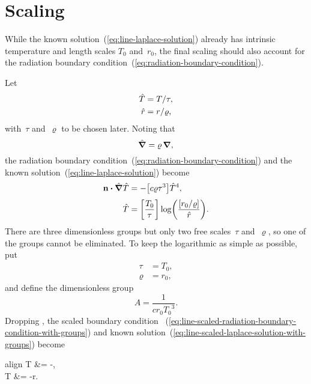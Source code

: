 \section{Scaling}
\label{sec:polar.scaling}

While the known solution~(\ref{eq:line-laplace-solution})
already has intrinsic temperature and length scales $T_0$ and~$r_0$,
the final scaling should also account for
the radiation boundary condition~(\ref{eq:radiation-boundary-condition}).

Let
\begin{align}
  \hat{T} &= T / \tau, \label{eq:line-scaled-temperature} \\
  \hat{r} &= r / \varrho, \label{eq:line-scaled-r}
\end{align}
with~$\tau$ and~$\varrho$ to be chosen later.
Noting that
\begin{equation}
  \mathop{}\!\hat{\mathop{}\!\boldsymbol{\mathrm{\nabla}}} = \varrho \mathop{}\!\boldsymbol{\mathrm{\nabla}},
  \label{eq:line-scaled-del}
\end{equation}
the radiation boundary condition~(\ref{eq:radiation-boundary-condition})
and the known solution~(\ref{eq:line-laplace-solution})
become
\begin{align}
  \normalvec \dotp \scaleddel \scaled{T}
    &= -\squarebr*{c \varrho \tau^3} \scaled{T}^4,
    \label{eq:line-scaled-radiation-boundary-condition-with-groups}
    \\[\fraclinespace]
  \scaled{T}
    &=
      \squarebr*{\frac{T_0}{\tau}}
      \log \roundbr*{\frac{\squarebr{r_0 / \varrho}}{\scaled{r}}}.
    \label{eq:line-scaled-laplace-solution-with-groups}
\end{align}
There are three dimensionless groups
but only two free scales~$\tau$ and~$\varrho$,
so one of the groups cannot be eliminated.
To keep the logarithmic as simple as possible,
put
\begin{align}
  \tau &= T_0,
    \label{eq:line-temperature-scale} \\
  \varrho &= r_0,
    \label{eq:line-length-scale}
\end{align}
and define the dimensionless group
\begin{equation}
  A = \frac{1}{c r_0 {T_0}^3}.
  \label{eq:line-dimensionless-group}
\end{equation}
Dropping \scalingaccents, the scaled boundary condition~%
  (\ref{eq:line-scaled-radiation-boundary-condition-with-groups})
and known solution~(\ref{eq:line-scaled-laplace-solution-with-groups})
become
\begin{important}{align}
  \normalvec \dotp \del T &= -,
    \label{eq:line-scaled-radiation-boundary-condition} \\[\fraclinespace]
  T &= -\log r.
    \label{eq:line-scaled-laplace-solution}
\end{important}

